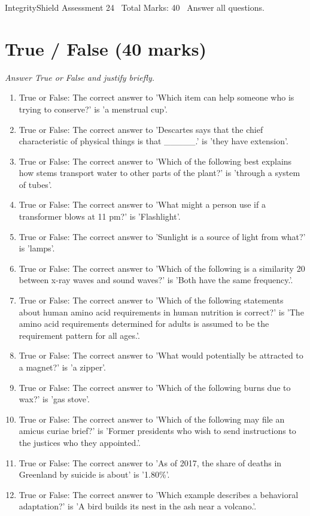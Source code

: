 \documentclass[12pt]{article}
\begin{document}
\begin{center}
IntegrityShield Assessment 24 \
Total Marks: 40 \
Answer all questions.
\end{center}

\section*{True / False (40 marks)}
\textit{Answer True or False and justify briefly.}
\begin{enumerate}[label=\arabic*.]
\item True or False: The correct answer to 'Which item can help someone who is trying to conserve?' is 'a menstrual cup'.
\item True or False: The correct answer to 'Descartes says that the chief characteristic of physical things is that \_\_\_\_\_.' is 'they have extension'.
\item True or False: The correct answer to 'Which of the following best explains how stems transport water to other parts of the plant?' is 'through a system of tubes'.
\item True or False: The correct answer to 'What might a person use if a transformer blows at 11 pm?' is 'Flashlight'.
\item True or False: The correct answer to 'Sunlight is a source of light from what?' is 'lamps'.
\item True or False: The correct answer to 'Which of the following is a similarity 20 between x-ray waves and sound waves?' is 'Both have the same frequency.'.
\item True or False: The correct answer to 'Which of the following statements about human amino acid requirements in human nutrition is correct?' is 'The amino acid requirements determined for adults is assumed to be the requirement pattern for all ages.'.
\item True or False: The correct answer to 'What would potentially be attracted to a magnet?' is 'a zipper'.
\item True or False: The correct answer to 'Which of the following burns due to wax?' is 'gas stove'.
\item True or False: The correct answer to 'Which of the following may file an amicus curiae brief?' is 'Former presidents who wish to send instructions to the justices who they appointed.'.
\item True or False: The correct answer to 'As of 2017, the share of deaths in Greenland by suicide is about' is '1.80\%'.
\item True or False: The correct answer to 'Which example describes a behavioral adaptation?' is 'A bird builds its nest in the ash near a volcano.'.

\end{enumerate}
\end{document}
